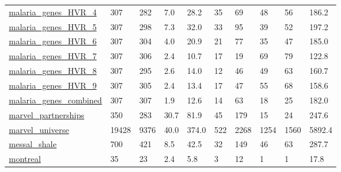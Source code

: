 \begin{longtable}{llllllllll}
 \href{https://github.com/dblarremore/data_malaria_PLOSCompBiology_2013}{malaria\_genes\_HVR\_4}                               & 307        & 282   & 7.0    & 28.2   & 35    & 69     & 48     & 56     & 186.2   \\
 \href{https://github.com/dblarremore/data_malaria_PLOSCompBiology_2013}{malaria\_genes\_HVR\_5}                               & 307        & 298   & 7.3    & 32.0   & 33    & 95     & 39     & 52     & 197.2   \\
 \href{https://github.com/dblarremore/data_malaria_PLOSCompBiology_2013}{malaria\_genes\_HVR\_6}                               & 307        & 304   & 4.0    & 20.9   & 21    & 77     & 35     & 47     & 185.0   \\
 \href{https://github.com/dblarremore/data_malaria_PLOSCompBiology_2013}{malaria\_genes\_HVR\_7}                               & 307        & 306   & 2.4    & 10.7   & 17    & 19     & 69     & 79     & 122.8   \\
 \href{https://github.com/dblarremore/data_malaria_PLOSCompBiology_2013}{malaria\_genes\_HVR\_8}                               & 307        & 295   & 2.6    & 14.0   & 12    & 46     & 49     & 63     & 160.7   \\
 \href{https://github.com/dblarremore/data_malaria_PLOSCompBiology_2013}{malaria\_genes\_HVR\_9}                               & 307        & 305   & 2.4    & 13.4   & 17    & 47     & 55     & 68     & 158.6   \\
 \href{https://github.com/dblarremore/data_malaria_PLOSCompBiology_2013}{malaria\_genes\_combined}                            & 307        & 307   & 1.9    & 12.6   & 14    & 63     & 18     & 25     & 182.0   \\
 \href{http://ix.io/1omF}{marvel\_partnerships}                                                                              & 350        & 283   & 30.7   & 81.9   & 45    & 179    & 15     & 24     & 247.6   \\
 \href{http://bioinfo.uib.es/~joemiro/marvel/porgat.txt}{marvel\_universe}                                                   & 19428      & 9376  & 40.0   & 374.0  & 522   & 2268   & 1254   & 1560   & 5892.4  \\
 \href{http://datadryad.org/resource/doi:10.5061/dryad.ps0f0}{messal\_shale}                                                 & 700        & 421   & 8.5    & 42.5   & 32    & 149    & 46     & 63     & 287.7   \\
 \href{https://sites.google.com/site/ucinetsoftware/datasets/covert-networks/montrealstreetgangs}{montreal}                 & 35         & 23    & 2.4    & 5.8    & 3     & 12     & 1      & 1      & 17.8    \\

\end{longtable}
